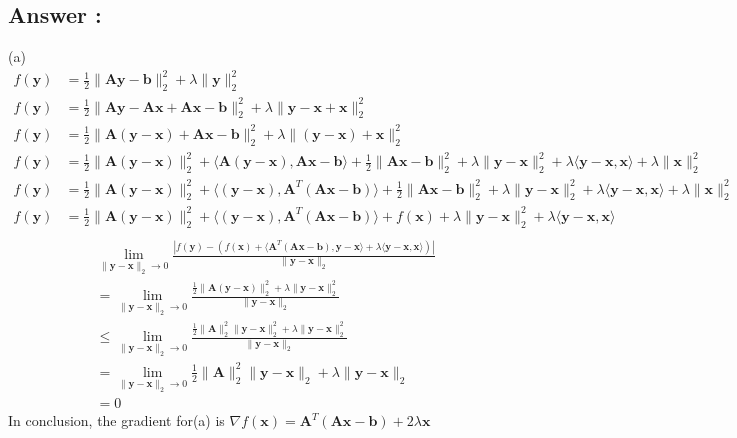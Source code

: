 \documentclass[a4paper,12pt]{article}
\begin{document}
\subsection*{Answer :}
(a)
\begin{align*}
    f(\bm{y}) &= \frac{1}{2} \|\bm{A}\bm{y} - \bm{b}\|_2^2 + \lambda\|\bm{y}\|_2^2 \\
    f(\bm{y}) &= \frac{1}{2} \|\bm{A}\bm{y} - \bm{A}\bm{x} + \bm{A}\bm{x} - \bm{b}\|_2^2 + \lambda\|\bm{y} - \bm{x} + \bm{x}\|_2^2 \\
    f(\bm{y}) &= \frac{1}{2} \|\bm{A}(\bm{y} - \bm{x}) + \bm{A}\bm{x} - \bm{b}\|_2^2 + \lambda\|(\bm{y} - \bm{x}) + \bm{x}\|_2^2 \\
    f(\bm{y}) &= \frac{1}{2} \|\bm{A}(\bm{y} - \bm{x})\|_2^2 + \langle \bm{A} (\bm{y} - \bm{x}), \bm{A}\bm{x} -\bm{b} \rangle+ \frac{1}{2}\|\bm{A}\bm{x} - \bm{b}\|_2^2 + \lambda\|\bm{y} - \bm{x}\|_2^2 + \lambda\langle \bm{y} - \bm{x}, \bm{x}\rangle + \lambda\|\bm{x}\|_2^2 \\
    f(\bm{y}) &= \frac{1}{2} \|\bm{A}(\bm{y} - \bm{x})\|_2^2 + \langle(\bm{y} - \bm{x}), \bm{A}^T(\bm{A}\bm{x} -\bm{b}) \rangle+ \frac{1}{2}\|\bm{A}\bm{x} - \bm{b}\|_2^2 + \lambda\|\bm{y} - \bm{x}\|_2^2 + \lambda\langle \bm{y} - \bm{x}, \bm{x}\rangle + \lambda\|\bm{x}\|_2^2 \\
    f(\bm{y}) &= \frac{1}{2} \|\bm{A}(\bm{y} - \bm{x})\|_2^2 + \langle(\bm{y} - \bm{x}), \bm{A}^T(\bm{A}\bm{x} -\bm{b}) \rangle+ f(\bm{x}) + \lambda\|\bm{y} - \bm{x}\|_2^2 + \lambda\langle \bm{y} - \bm{x}, \bm{x}\rangle \\
\end{align*}
\begin{align*}
    &\lim_{\|\bm{y} - \bm{x}\|_2 \to 0} \frac{ |f(\bm{y}) - (f(\bm{x}) + \langle \bm{A}^T(\bm{A}\bm{x} - \bm{b}), \bm{y} - \bm{x}\rangle + \lambda \langle \bm{y} - \bm{x}, \bm{x} \rangle)| }{\|\bm{y} - \bm{x}\|_2} \\
    &= \lim_{\|\bm{y} - \bm{x}\|_2 \to 0} \frac{\frac{1}{2} \|\bm{A}(\bm{y} - \bm{x})\|_2^2 + \lambda \| \bm{y} - \bm{x}\|_2^2}{\|\bm{y} - \bm{x}\|_2} \\
    &\leq \lim_{\|\bm{y} - \bm{x}\|_2 \to 0} \frac{\frac{1}{2} \|\bm{A}\|_2^2\|\bm{y} - \bm{x}\|_2^2 + \lambda \| \bm{y} - \bm{x}\|_2^2}{\|\bm{y} - \bm{x}\|_2} \\
    &= \lim_{\|\bm{y} - \bm{x}\|_2 \to 0} \frac{1}{2} \|\bm{A}\|_2^2\|\bm{y} - \bm{x}\|_2 + \lambda \| \bm{y} - \bm{x}\|_2 \\
    &= 0
\end{align*}
In conclusion, the gradient for(a) is \(\nabla f(\bm{x}) = \bm{A}^T(\bm{A}\bm{x} - \bm{b}) + 2\lambda \bm{x}\) \\
\end{document}
